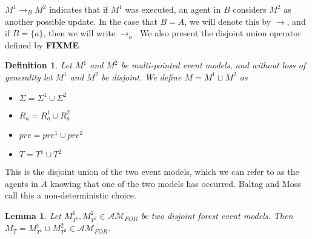 \documentclass[12pt, a4paper, titlepage]{article}
\newtheorem{defn}{Definition}[subsection]
\newtheorem{lemma}{Lemma}[subsection]
\numberwithin{equation}{section}
\newcommand{\eventClass}{\mathcal{AM}}
\newcommand{\forestClass}{\eventClass_{FOR}}
\newcommand{\FIXME}{{\bf FIXME}}
\begin{document}
$M^1 \to_B M^2$ indicates that if $M^1$ was executed, an agent in $B$ considers $M^2$ as another
possible update.
In the case that $B = A$, we will denote this by $\to$, and if $B = \{a\}$, then
we will write $\to_a$.
We also present the disjoint union operator defined by \FIXME.


\begin{defn} \label{disjoint}
Let $M^1$ and $M^2$ be multi-pointed event models, and without loss of generality let $M^1$ and
$M^2$ be disjoint.
We define $M = M^1 \sqcup M^2$ as
\begin{itemize}
	\item $\Sigma = \Sigma^1 \cup \Sigma^2$
	\item $R_a = R^1_a \cup R^2_a$
	\item $pre = pre^1 \cup pre^2$
	\item $T = T^1 \cup T^2$
\end{itemize}
\end{defn}
This is the disjoint union of the two event models, which we can refer to as the agents in $A$
knowing that one of the two models has occurred.
Baltag and Moss call this a non-deterministic choice.

\begin{lemma} \label{disjForestIsForest}
Let $M^1_{T^1}, M^2_{T^2} \in \forestClass$ be two disjoint forest event models.
Then $M_T = M^1_{T^1} \sqcup M^2_{T^2} \in \forestClass$.
\end{lemma}
\end{document}
